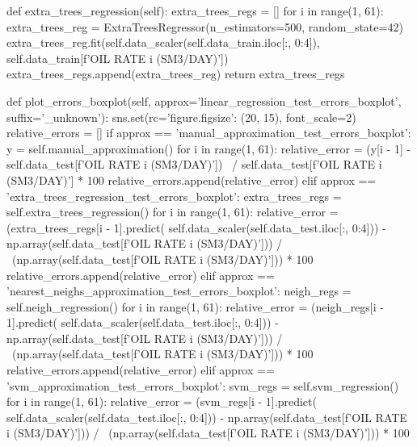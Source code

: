 \begin{pythoncode}
    def extra_trees_regression(self):
        extra_trees_regs = []
        for i in range(1, 61):
            extra_trees_reg = ExtraTreesRegressor(n_estimators=500, random_state=42)
            extra_trees_reg.fit(self.data_scaler(self.data_train.iloc[:, 0:4]),
                                self.data_train[f'OIL RATE {i} (SM3/DAY)'])
            extra_trees_regs.append(extra_trees_reg)
        return extra_trees_regs

    def plot_errors_boxplot(self, approx='linear_regression_test_errors_boxplot',
                            suffix='_unknown'):
        sns.set(rc={'figure.figsize': (20, 15)}, font_scale=2)
        relative_errors = []
        if approx == 'manual_approximation_test_errors_boxplot':
            y = self.manual_approximation()
            for i in range(1, 61):
                relative_error = (y[i - 1] - 
                                  self.data_test[f'OIL RATE {i} (SM3/DAY)']) \
                                 / self.data_test[f'OIL RATE {i} (SM3/DAY)'] * 100
                relative_errors.append(relative_error)
        elif approx == 'extra_trees_regression_test_errors_boxplot':
            extra_trees_regs = self.extra_trees_regression()
            for i in range(1, 61):
                relative_error = (extra_trees_regs[i - 1].predict(
                    self.data_scaler(self.data_test.iloc[:, 0:4])) -
                                  np.array(self.data_test[f'OIL RATE {i} (SM3/DAY)'])) / \
                                 (np.array(self.data_test[f'OIL RATE {i} (SM3/DAY)'])) * 100
                relative_errors.append(relative_error)
        elif approx == 'nearest_neighs_approximation_test_errors_boxplot':
            neigh_regs = self.neigh_regression()
            for i in range(1, 61):
                relative_error = (neigh_regs[i - 1].predict(
                    self.data_scaler(self.data_test.iloc[:, 0:4])) -
                                  np.array(self.data_test[f'OIL RATE {i} (SM3/DAY)'])) / \
                                 (np.array(self.data_test[f'OIL RATE {i} (SM3/DAY)'])) * 100
                relative_errors.append(relative_error)
        elif approx == 'svm_approximation_test_errors_boxplot':
            svm_regs = self.svm_regression()
            for i in range(1, 61):
                relative_error = (svm_regs[i - 1].predict(
                    self.data_scaler(self.data_test.iloc[:, 0:4])) -
                                  np.array(self.data_test[f'OIL RATE {i} (SM3/DAY)'])) / \
                                 (np.array(self.data_test[f'OIL RATE {i} (SM3/DAY)'])) * 100

\end{pythoncode}
